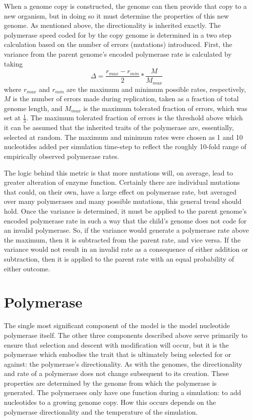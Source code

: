 When a genome copy is constructed, the genome can then provide that copy to a new organism, but in doing so it must determine the properties of this new genome. As mentioned above, the directionality is inherited exactly. The polymerase speed coded for by the copy genome is determined in a two step calculation based on the number of errors (mutations) introduced. First, the variance from the parent genome's encoded polymerase rate is calculated by taking\[
	\Delta = \frac{r_{max} - r_{min}}{2}*\frac{M}{M_{max}}
\]
where $r_{max}$ and $r_{min}$ are the maximum and minimum possible rates, respectively, $M$ is the number of errors made during replication, taken as a fraction of total genome length, and $M_{max}$ is the maximum tolerated fraction of errors, which was set at $\frac{1}{3}$. The maximum tolerated fraction of errors is the threshold above which it can be assumed that the inherited traits of the polymerase are, essentially, selected at random. The maximum and minimum rates were chosen as 1 and 10 nucleotides added per simulation time-step to reflect the roughly 10-fold range of empirically observed polymerase rates.

The logic behind this metric is that more mutations will, on average, lead to greater alteration of enzyme function. Certainly there are individual mutations that could, on their own, have a large effect on polymerase rate, but averaged over many polymerases and many possible mutations, this general trend should hold. Once the variance is determined, it must be applied to the parent genome's encoded polymerase rate in such a way that the child's genome does not code for an invalid polymerase. So, if the variance would generate a polymerase rate above the maximum, then it is subtracted from the parent rate, and vice versa. If the variance would not result in an invalid rate as a consequence of either addition or subtraction, then it is applied to the parent rate with an equal probability of either outcome.

\section*{Polymerase} %
\label{sec:polymerase}
The single most significant component of the model is the model nucleotide polymerase itself. The other three components described above serve primarily to ensure that selection and descent with modification will occur, but it is the polymerase which embodies the trait that is ultimately being selected for or against: the polymerase's directionality. As with the genomes, the directionality and rate of a polymerase does not change subsequent to its creation. These properties are determined by the genome from which the polymerase is generated. The polymerases only have one function during a simulation: to add nucleotides to a growing genome copy. How this occurs depends on the polymerase directionality and the temperature of the simulation.

